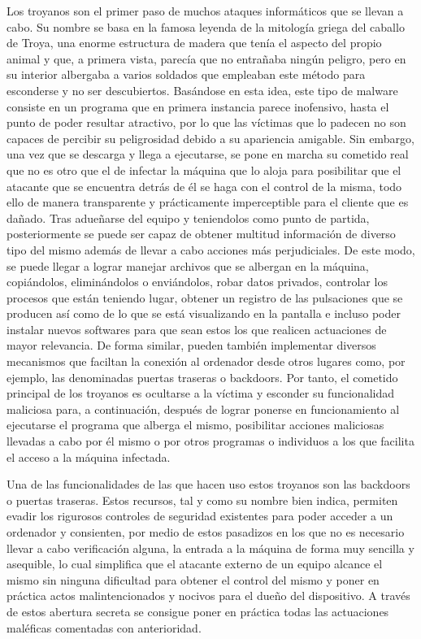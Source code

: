 Los troyanos son el primer paso de muchos ataques informáticos que se llevan a cabo. Su nombre se basa en la famosa leyenda de la mitología griega del caballo de Troya, una enorme estructura de madera que tenía el aspecto del propio animal y que, a primera vista, parecía que no entrañaba ningún peligro, pero en su interior albergaba a varios soldados que empleaban este método para esconderse y no ser descubiertos. Basándose en esta idea, este tipo de malware consiste en un programa que en primera instancia parece inofensivo, hasta el punto de poder resultar atractivo, por lo que las víctimas que lo padecen no son capaces de percibir su peligrosidad debido a su apariencia amigable. Sin embargo, una vez que se descarga y llega a ejecutarse, se pone en marcha su cometido real que no es otro que el de infectar la máquina que lo aloja para posibilitar que el atacante que se encuentra detrás de él se haga con el control de la misma, todo ello de manera transparente y prácticamente imperceptible para el cliente que es dañado. Tras adueñarse del equipo y teniendolos como punto de partida, posteriormente se puede ser capaz de obtener multitud información de diverso tipo del mismo además de llevar a cabo acciones más perjudiciales. De este modo, se puede llegar a lograr manejar archivos que se albergan en la máquina, copiándolos, eliminándolos o enviándolos, robar datos privados, controlar los procesos que están teniendo lugar, obtener un registro de las pulsaciones que se producen así como de lo que se está visualizando en la pantalla e incluso poder instalar nuevos softwares para que sean estos los que realicen actuaciones de mayor relevancia. De forma similar, pueden también implementar diversos mecanismos que faciltan la conexión al ordenador desde otros lugares como, por ejemplo, las denominadas puertas traseras o backdoors. Por tanto, el cometido principal de los troyanos es ocultarse a la víctima y esconder su funcionalidad maliciosa para, a continuación, después de lograr ponerse en funcionamiento al ejecutarse el programa que alberga el mismo, posibilitar acciones maliciosas llevadas a cabo por él mismo o por otros programas o individuos a los que facilita el acceso a la máquina infectada.

Una de las funcionalidades de las que hacen uso estos troyanos son las backdoors o puertas traseras. Estos recursos, tal y como su nombre bien indica, permiten evadir los rigurosos controles de seguridad existentes para poder acceder a un ordenador y consienten, por medio de estos pasadizos en los que no es necesario llevar a cabo verificación alguna, la entrada a la máquina de forma muy sencilla y asequible, lo cual simplifica que el atacante externo de un equipo alcance el mismo sin ninguna dificultad para obtener el control del mismo y poner en práctica actos malintencionados y nocivos para el dueño del dispositivo. A través de estos abertura secreta se consigue poner en práctica todas las actuaciones maléficas comentadas con anterioridad.

